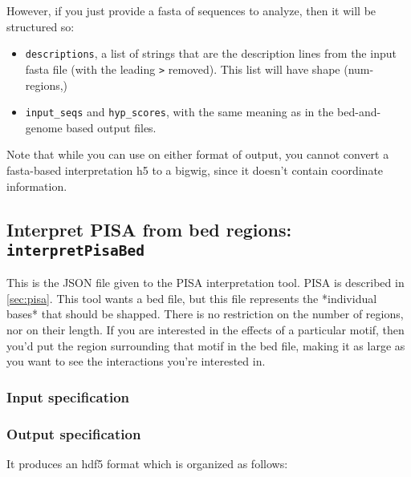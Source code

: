 \documentclass{article}
\begin{document}
However, if you just provide a fasta of sequences to analyze, then it will be structured so:

\begin{itemize}
    \item \texttt{descriptions}, a list of strings that are the description lines from
        the input fasta file (with the leading \texttt{>} removed). This list will have shape
        (num-regions,)
    \item \texttt{input\_seqs} and \texttt{hyp\_scores}, with the same meaning
        as in the bed-and-genome based output files.
\end{itemize}

Note that while you can use  on either format of  output,
you cannot convert a fasta-based interpretation h5 to a bigwig, since it doesn't contain
coordinate information.


\newpage
\subsection{Interpret PISA from bed regions: \texttt{interpretPisaBed}}\label{prog:interpretPisaBed}

This is the JSON file given to the PISA interpretation tool. PISA is described in \ref{sec:pisa}.
This tool wants a bed file, but this file represents the *individual bases* that should be shapped.
There is no restriction on the number of regions, nor on their length. If you are interested in
the effects of a particular motif,
then you'd put the region surrounding that motif in the bed file, making it as large as you want
to see the interactions you're interested in.

\subsubsection{Input specification}



\subsubsection{Output specification}

It produces an hdf5 format which is organized as follows:
\end{document}
